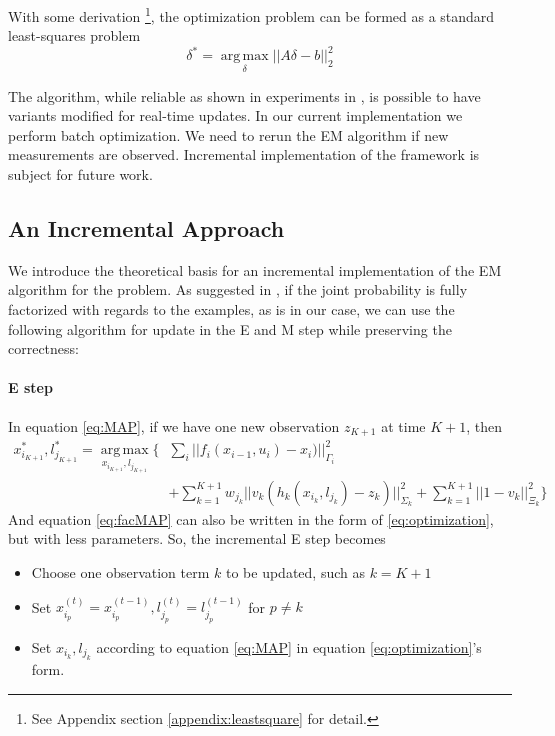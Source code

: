 With some derivation \footnote{See Appendix section \ref{appendix:leastsquare} for detail.}, the optimization problem can be formed as a standard least-squares problem
\begin{equation}
\delta^* = \operatorname*{arg\,max}_\delta||A\delta - b||_2^2
\label{eq:optimization}
\end{equation}

The algorithm, while reliable as shown in experiments in \cite{haehnel03iros}, is possible to have variants modified for real-time updates. In our current implementation we perform batch optimization. We need to rerun the EM algorithm if new measurements are observed. Incremental implementation of the framework is subject for future work.

\subsection{An Incremental Approach}
We introduce the theoretical basis for an incremental implementation of the EM algorithm for the problem. As suggested in \cite{neal1998EM}, if the joint probability is fully factorized with regards to the examples, as is in our case, we can use the following algorithm for update in the E and M step while preserving the correctness:

\paragraph{E step} 
In equation \ref{eq:MAP}, if we have one new observation $z_{K+1}$ at time $K+1$, then
\begin{equation}
\begin{aligned}
x_{i_{K+1}}^*, l_{j_{K+1}}^* = \operatorname*{arg\,max}_{ x_{i_{K+1}}, l_{j_{K+1}}} \{ &\sum_{i}||f_i(x_{i-1}, u_i) - x_i)||^2_{\Gamma_i} \\
&+ \sum_{k=1}^{K+1} w_{j_k}||v_k(h_k(x_{i_k}, l_{j_k}) - z_k)||^2_{\Sigma_k} + \sum_{k=1}^{K+1}||1-v_k||^2_{\Xi_k} \}
\end{aligned}
\label{eq:facMAP}
\end{equation}
And equation \ref{eq:facMAP} can also be written in the form of \ref{eq:optimization}, but with less parameters. So, the incremental E step becomes
\begin{itemize}
\item Choose one observation term $k$ to be updated, such as $k = K+1$
\item Set $x_{i_p}^{(t)} = x_{i_p}^{(t-1)}, l_{j_p}^{(t)} = l_{j_p}^{(t-1)}$ for $p \neq k$
\item Set $x_{i_k}, l_{j_k}$ according to equation \ref{eq:MAP} in equation \ref{eq:optimization}'s form.
\end{itemize}
